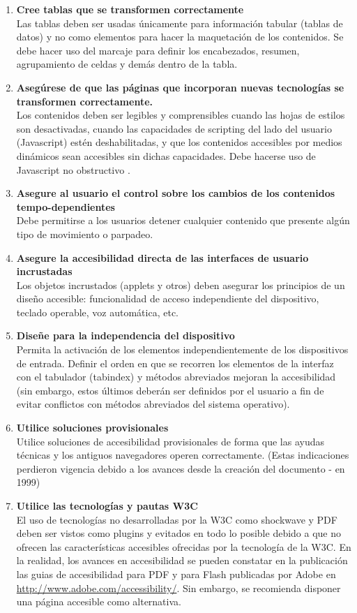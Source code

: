 \begin{enumerate}
	\item \textbf{Cree tablas que se transformen correctamente}\\ Las tablas deben ser usadas únicamente para información tabular (tablas de datos) y no como elementos para hacer la maquetación de los contenidos. Se debe hacer uso del marcaje para definir los encabezados, resumen, agrupamiento de celdas y demás dentro de la tabla.
	\item \textbf{Asegúrese de que las páginas que incorporan nuevas tecnologías se transformen correctamente.}\\ Los contenidos deben ser legibles y comprensibles cuando las hojas de estilos son desactivadas, cuando las capacidades de scripting del lado del usuario (Javascript) estén deshabilitadas, y que los contenidos accesibles por medios dinámicos sean accesibles sin dichas capacidades. Debe hacerse uso de Javascript no obstructivo \citep{Accesabilidad_JS2007}.
	\item \textbf{Asegure al usuario el control sobre los cambios de los contenidos tempo-dependientes}\\ Debe permitirse a los usuarios detener cualquier contenido que presente algún tipo de movimiento o parpadeo.
	\item \textbf{Asegure la accesibilidad directa de las interfaces de usuario incrustadas}\\ Los objetos incrustados (applets y otros) deben asegurar los principios de un diseño accesible: funcionalidad de acceso independiente del dispositivo, teclado operable, voz automática, etc.
	\item \textbf{Diseñe para la independencia del dispositivo}\\ Permita la activación de los elementos independientemente de los dispositivos de entrada. Definir el orden en que se recorren los elementos de la interfaz con el tabulador (tabindex) y métodos abreviados mejoran la accesibilidad (sin embargo, estos últimos deberán ser definidos por el usuario a fin de evitar conflictos con métodos abreviados del sistema operativo).
	\item \textbf{Utilice soluciones provisionales}\\  Utilice soluciones de accesibilidad provisionales de forma que las ayudas técnicas y los antiguos navegadores operen correctamente. (Estas indicaciones perdieron vigencia debido a los avances desde la creación del documento - en 1999)
	\item \textbf{Utilice las tecnologías y pautas W3C}\\ El uso de tecnologías no desarrolladas por la W3C como shockwave y PDF deben ser vistos como plugins y evitados en todo lo posible debido a que no ofrecen las características accesibles ofrecidas por la tecnología de la W3C. En la realidad, los avances en accesibilidad se pueden constatar en la publicación las guias de accesibilidad para PDF y para Flash publicadas por Adobe en \url{http://www.adobe.com/accessibility/}. Sin embargo, se recomienda disponer una página accesible como alternativa.

\end{enumerate}
